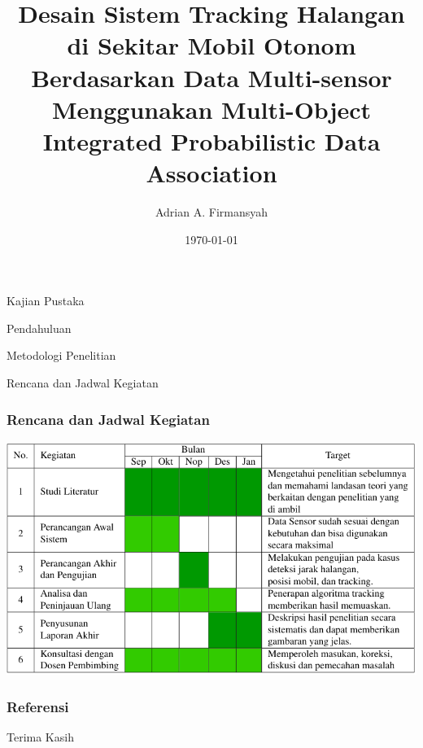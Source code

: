 \documentclass[10pt,aspectratio=169]{beamer}    %
\title[Tracking Multi-sensor dengan MIPDA]{Desain Sistem Tracking Halangan di Sekitar Mobil Otonom Berdasarkan Data Multi-sensor Menggunakan Multi-Object Integrated Probabilistic Data Association}
\author{Adrian A. Firmansyah } %
\institute[ITS] %
{\noindent
    adrianaryaputra@icloud.com\\
    6022201027\\
}
\date{\dmydate\today} %
\begin{document}
{
    \begin{frame}
        \titlepage
    \end{frame}
}


\begin{frame}
    \Huge
    \begin{center}
        Kajian Pustaka
    \end{center}
\end{frame}







\begin{frame}
    \Huge
    \begin{center}
        Pendahuluan
    \end{center}
\end{frame}





\begin{frame}
    \Huge
    \begin{center}
        Metodologi Penelitian
    \end{center}
\end{frame}





\begin{frame}
    \Huge
    \begin{center}
        Rencana dan Jadwal Kegiatan
    \end{center}
\end{frame}


\begin{frame}
    \frametitle{Rencana dan Jadwal Kegiatan}
    \centering
    \includegraphics[width=.7\textwidth]{jadwal.png}
\end{frame}


\begin{frame}[allowframebreaks]
    \frametitle{Referensi}
    \printbibliography
\end{frame}


\begin{frame}
    \Huge
    \begin{center}
        Terima Kasih
    \end{center}
\end{frame}





\end{document}

